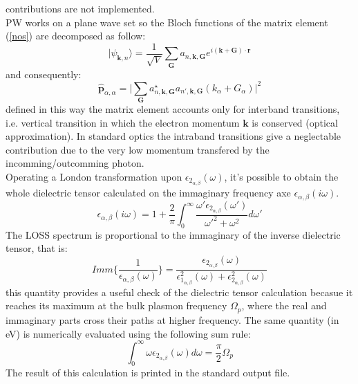 \documentclass[twocolumn]{article}
\begin{document}
contributions are not implemented.\\
PW works on a plane wave set so the Bloch functions of the matrix element (\ref{nos}) are decomposed as follow:
\begin{equation}
\vert \psi_{\textbf{k},n}\rangle=\frac{1}{\sqrt{V}}\sum_{\textbf{G}}a_{n,\textbf{k},\textbf{G}}
e^{i(\textbf{k}+\textbf{G})\cdot\textbf{r}}
\end{equation}
and consequently:
\begin{equation}
\hat{\textbf{p}}_{\alpha,\alpha}=\vert\sum_{\textbf{G}}a^{\star}_{n,\textbf{k},\textbf{G}}a_{n',\textbf{k},\textbf{G}}
(k_{\alpha}+G_{\alpha})\vert^{2}
\end{equation}
defined in this way the matrix element accounts only for interband transitions, i.e. vertical transition in which the 
electron momentum $\textbf{k}$ is conserved (optical approximation). In standard optics the intraband transitions give a 
neglectable contribution due to the very low momentum transfered by the incomming/outcomming photon.\\
Operating a London transformation upon $\epsilon_{2_{\alpha,\beta}}(\omega)$, it's possible to obtain the whole dielectric
tensor calculated on the immaginary frequency axe $\epsilon_{\alpha,\beta}(i\omega)$. 
\begin{equation}
\epsilon_{\alpha,\beta}(i\omega)=1+\frac{2}{\pi}\int_{0}^{\infty}\frac{\omega' \epsilon_{2_{\alpha,\beta}}(\omega')}
{\omega'^{2}+\omega^{2}}d\omega'
\end{equation}
The LOSS spectrum is proportional to the immaginary of the inverse dielectric tensor, that is:
\begin{equation}
Imm\Bigg\{\frac{1}{\epsilon_{\alpha,\beta}(\omega)}\Bigg\}=
\frac{\epsilon_{2_{\alpha,\beta}}(\omega)}{\epsilon_{1_{\alpha,\beta}}^{2}(\omega)+
\epsilon_{2_{\alpha,\beta}}^{2}(\omega)}
\end{equation}
this quantity provides a useful check of the dielectric tensor calculation becasue it reaches its maximum at the bulk plasmon
frequency $\Omega_{p}$, where the real and immaginary parts cross their paths at higher frequency. The same quantity (in eV)
is numerically evaluated using the following sum rule:
\begin{equation}
\int_{0}^{\infty}\omega\epsilon_{2_{\alpha,\beta}}(\omega)d\omega=\frac{\pi}{2}\Omega_{p}
\end{equation}  
The result of this calculation is printed in the standard output file.
\end{document}
